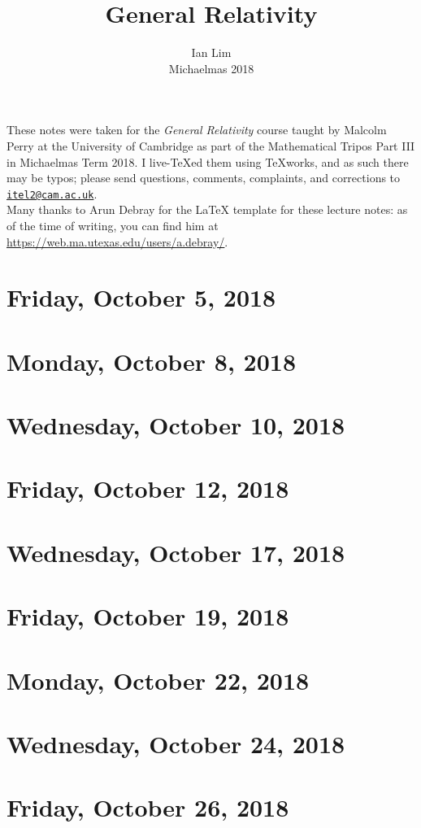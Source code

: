 \documentclass[reqno]{amsart}
\begin{document}
\title{General Relativity}
\author{Ian Lim\\ Michaelmas 2018}
\maketitle
{\small\noindent These notes were taken for the \textit{General Relativity} course taught by Malcolm Perry at the University of Cambridge as part of the Mathematical Tripos Part III in Michaelmas Term 2018. I live-\TeX ed them using TeXworks, and as such there may be typos; please send questions, comments, complaints, and corrections to 
\href{mailto:itel2@cam.ac.uk?subject=GR\%20Lecture\%20Notes}{\texttt{itel2@cam.ac.uk}}.\\
Many thanks to Arun Debray for the {\LaTeX} template for these lecture notes: as of the time of writing, you can find him at \url{https://web.ma.utexas.edu/users/a.debray/}.}

\tableofcontents

\section{Friday, October 5, 2018}
	

\section{Monday, October 8, 2018}
	

\section{Wednesday, October 10, 2018}
	

\section{Friday, October 12, 2018}
	

\section{Wednesday, October 17, 2018}
    

\section{Friday, October 19, 2018}
    
    
\section{Monday, October 22, 2018}
    
    
\section{Wednesday, October 24, 2018}
    

\section{Friday, October 26, 2018}
    
\end{document}
